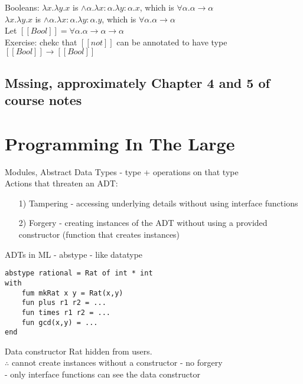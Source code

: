 \documentclass[11pt]{article}
\begin{document}
Booleans: $\lambda x.\lambda y.x$ is $\land \alpha. \lambda x:\alpha.\lambda y: \alpha.x$, which is $\forall \alpha.\alpha \rightarrow \alpha$ \\

$\lambda x.\lambda y.x$ is $\land \alpha. \lambda x:\alpha.\lambda y: \alpha.y$, which is $\forall \alpha.\alpha \rightarrow \alpha$ \\

Let $[[Bool]] = \forall \alpha.\alpha \rightarrow \alpha \rightarrow \alpha$ \\

Exercise: chekc that $[[not]]$ can be annotated to have type $[[Bool]] \rightarrow [[Bool]]$

\subsection{Mssing, approximately Chapter 4 and 5 of course notes}

\section{Programming In The Large}

Modules, Abstract Data Types - type + operations on that type \\

Actions that threaten an ADT:
\begin{itemize}
	\item[1)] Tampering - accessing underlying details without using interface functions
	\item[2)] Forgery - creating instances of the ADT without using a provided constructor (function that creates instances)
\end{itemize}

ADTs in ML - abstype - like datatype 
\begin{verbatim}
abstype rational = Rat of int * int
with 
	fum mkRat x y = Rat(x,y)
	fun plus r1 r2 = ...
	fun times r1 r2 = ...
	fun gcd(x,y) = ...
end
\end{verbatim}

Data constructor Rat hidden from users. \\

$\therefore$ cannot create instances without a constructor - no forgery \\

- only interface functions can see the data constructor \\
\end{document}
